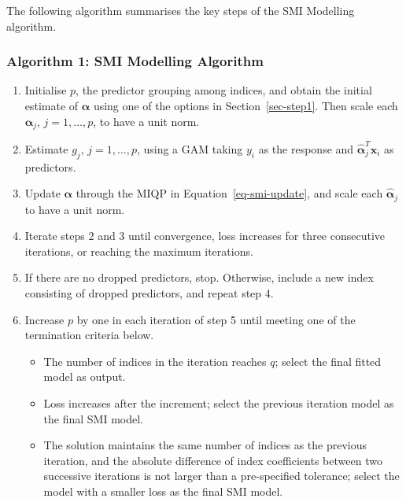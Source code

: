 \documentclass[
  11pt,
  a4paper,
]{article}
\providecommand{\tightlist}{%
  \setlength{\itemsep}{0pt}\setlength{\parskip}{0pt}}\usepackage{longtable,booktabs,array}
\begin{document}
The following algorithm summarises the key steps of the SMI Modelling
algorithm. \newline

\subsubsection*{Algorithm 1: SMI Modelling
Algorithm}\label{algorithm-1-smi-modelling-algorithm}

\begin{enumerate}
\def\labelenumi{\arabic{enumi}.}
\tightlist
\item
  Initialise \(p\), the predictor grouping among indices, and obtain the
  initial estimate of \(\bm{\alpha}\) using one of the options in
  Section~\ref{sec-step1}. Then scale each \(\hat{\bm{\alpha}}_{j}\),
  \(j=1,\dots,p\), to have a unit norm.
\item
  Estimate \(g_{j}\), \(j=1,\dots,p\), using a GAM taking \(y_{i}\) as
  the response and \(\hat{\bm{\alpha}}_{j}^{T}\bm{x}_{i}\) as
  predictors.
\item
  Update \(\bm{\alpha}\) through the MIQP in
  Equation~\ref{eq-smi-update}, and scale each \(\hat{\bm{\alpha}}_{j}\)
  to have a unit norm.
\item
  Iterate steps 2 and 3 until convergence, loss increases for three
  consecutive iterations, or reaching the maximum iterations.
\item
  If there are no dropped predictors, stop. Otherwise, include a new
  index consisting of dropped predictors, and repeat step 4.
\item
  Increase \(p\) by one in each iteration of step 5 until meeting one of
  the termination criteria below.

  \begin{itemize}
  \tightlist
  \item
    The number of indices in the iteration reaches \(q\); select the
    final fitted model as output.
  \item
    Loss increases after the increment; select the previous iteration
    model as the final SMI model.
  \item
    The solution maintains the same number of indices as the previous
    iteration, and the absolute difference of index coefficients between
    two successive iterations is not larger than a pre-specified
    tolerance; select the model with a smaller loss as the final SMI
    model.
  \end{itemize}
\end{enumerate}
\end{document}
